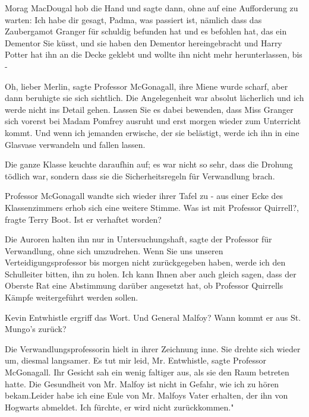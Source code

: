 Morag MacDougal hob die Hand und sagte dann, ohne auf eine Aufforderung zu
warten: \glqq{}Ich habe dir gesagt, Padma, was passiert ist, nämlich dass das
Zaubergamot Granger für schuldig befunden hat und es befohlen hat, das ein
Dementor Sie küsst, und sie haben den Dementor hereingebracht und Harry Potter
hat ihn an die Decke geklebt und wollte ihn nicht mehr herunterlassen, bis
-\grqq{}

\glqq{}Oh, lieber Merlin\grqq{}, sagte Professor McGonagall, ihre Miene wurde
scharf, aber dann beruhigte sie sich sichtlich. \glqq{}Die Angelegenheit war
absolut lächerlich und ich werde nicht ins Detail gehen. Lassen Sie es dabei
bewenden, dass Miss Granger sich vorerst bei Madam Pomfrey ausruht und erst
morgen wieder zum Unterricht kommt. Und wenn ich jemanden erwische, der sie
belästigt, werde ich ihn in eine Glasvase verwandeln und fallen lassen.\grqq{}

Die ganze Klasse keuchte daraufhin auf; es war nicht so sehr, dass die Drohung
tödlich war, sondern dass sie die Sicherheitsregeln für Verwandlung brach.

Professor McGonagall wandte sich wieder ihrer Tafel zu - aus einer Ecke des
Klassenzimmers erhob sich eine weitere Stimme. \glqq{}Was ist mit Professor
Quirrell?\grqq{}, fragte Terry Boot. \glqq{}Ist er verhaftet worden?\grqq{}

\glqq{}Die Auroren halten ihn nur in Untersuchungshaft\grqq{}, sagte der
Professor für Verwandlung, ohne sich umzudrehen. \glqq{}Wenn Sie uns unseren
Verteidigungsprofessor bis morgen nicht zurückgegeben haben, werde ich den
Schulleiter bitten, ihn zu holen. Ich kann Ihnen aber auch gleich sagen, dass
der Oberste Rat eine Abstimmung darüber angesetzt hat, ob Professor Quirrells
Kämpfe weitergeführt werden sollen.\grqq{}

Kevin Entwhistle ergriff das Wort. \glqq{}Und General Malfoy? Wann kommt er aus
St. Mungo's zurück?\grqq{}

Die Verwandlungsprofessorin hielt in ihrer Zeichnung inne. Sie drehte sich
wieder um, diesmal langsamer. \glqq{}Es tut mir leid, Mr. Entwhistle\grqq{},
sagte Professor McGonagall. Ihr Gesicht sah ein wenig faltiger aus, als sie den
Raum betreten hatte. \glqq{}Die Gesundheit von Mr. Malfoy ist nicht in Gefahr,
wie ich zu hören bekam.Leider habe ich eine Eule von Mr. Malfoys Vater erhalten,
der ihn von Hogwarts abmeldet. Ich fürchte, er wird nicht zurückkommen."

